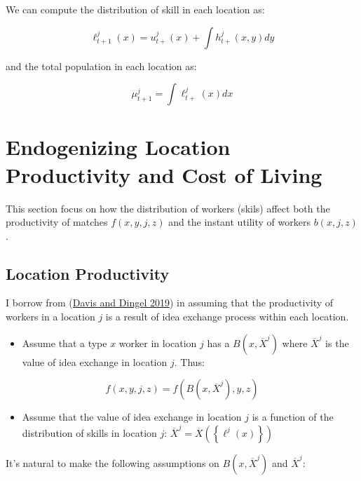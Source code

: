 \documentclass[
  letterpaper,
  DIV=11,
  numbers=noendperiod]{scrreprt}
\providecommand{\tightlist}{%
  \setlength{\itemsep}{0pt}\setlength{\parskip}{0pt}}\usepackage{longtable,booktabs,array}
\begin{document}
We can compute the distribution of skill in each location as:

\[\ell^j_{t+1}(x) = u^j_{t+}(x) + \int h^j_{t+}(x,y)dy\]

and the total population in each location as:

\[\mu^j_{t+1} = \int \ell^j_{t+}(x)dx\]


\hypertarget{endogenizing-location-productivity-and-cost-of-living}{%
\chapter{Endogenizing Location Productivity and Cost of
Living}\label{endogenizing-location-productivity-and-cost-of-living}}

This section focus on how the distribution of workers (skils) affect
both the productivity of matches \(f(x,y,j,z)\) and the instant utility
of workers \(b(x,j,z)\).

\hypertarget{location-productivity}{%
\section{Location Productivity}\label{location-productivity}}

I borrow from
(\protect\hyperlink{ref-davisSpatialKnowledgeEconomy2019}{Davis and
Dingel 2019}) in assuming that the productivity of workers in a location
\(j\) is a result of idea exchange process within each location.

\begin{itemize}
\tightlist
\item
  Assume that a type \(x\) worker in location \(j\) has a
  \(B(x, \overline{X}^j)\) where \(\overline{X}^j\) is the value of idea
  exchange in location \(j\). Thus:
\end{itemize}

\[f(x,y,j,z) = f\left(B(x, \overline{X}^j), y, z\right)\]

\begin{itemize}
\tightlist
\item
  Assume that the value of idea exchange in location \(j\) is a function
  of the distribution of skills in location \(j\):
  \(\overline{X}^j = \overline{X}\left(\left\{\ell^j(x)\right\}\right)\)
\end{itemize}

It's natural to make the following assumptions on
\(B(x, \overline{X}^j)\) and \(\overline{X}^j\):
\end{document}

